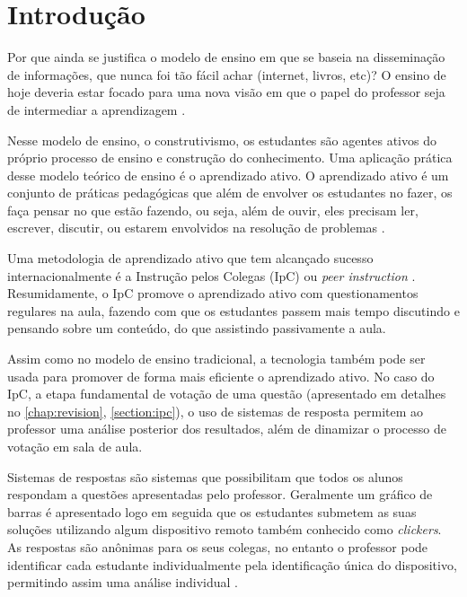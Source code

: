 \chapter{Introdução}

Por que ainda se justifica o modelo de ensino em que se baseia
na disseminação de informações, que nunca foi tão fácil achar (internet,
livros, etc)? O ensino de hoje deveria estar focado para uma nova
visão em que o papel do professor seja de intermediar a aprendizagem \cite{Araujo2013}.

Nesse modelo de ensino, o construtivismo, os estudantes são agentes ativos do próprio processo
de ensino e construção do conhecimento. Uma aplicação prática desse modelo teórico de ensino é o aprendizado ativo.
O aprendizado ativo é um conjunto de práticas pedagógicas que além de envolver os estudantes no
fazer, os faça pensar no que estão fazendo, ou seja, além de ouvir, eles precisam ler,
escrever, discutir, ou estarem envolvidos na resolução de problemas \cite{Charles1991}.

Uma metodologia de aprendizado ativo que tem alcançado sucesso internacionalmente é
a Instrução pelos Colegas (IpC) ou \textit{peer instruction} \cite{Araujo2013}. Resumidamente,
o IpC promove o aprendizado ativo com questionamentos regulares na aula, fazendo com que os
estudantes passem mais tempo discutindo e pensando sobre um conteúdo, do que assistindo passivamente a aula.

Assim como no modelo de ensino tradicional, a tecnologia também pode ser usada para promover
de forma mais eficiente o aprendizado ativo. No caso do IpC, a etapa fundamental de votação de uma questão
(apresentado em detalhes no \autoref{chap:revision}, \autoref{section:ipc}),
o uso de sistemas de resposta permitem ao professor uma análise posterior dos resultados,
além de dinamizar o processo de votação em sala de aula.

Sistemas de respostas são sistemas que possibilitam que todos os alunos
respondam a questões apresentadas pelo professor. Geralmente um gráfico de barras
é apresentado logo em seguida que os estudantes submetem as suas soluções
utilizando algum dispositivo remoto também conhecido como \textit{clickers}. As respostas são anônimas para os seus colegas,
no entanto o professor pode identificar cada estudante individualmente pela
identificação única do dispositivo, permitindo assim uma análise individual \cite{Kay2009}.

